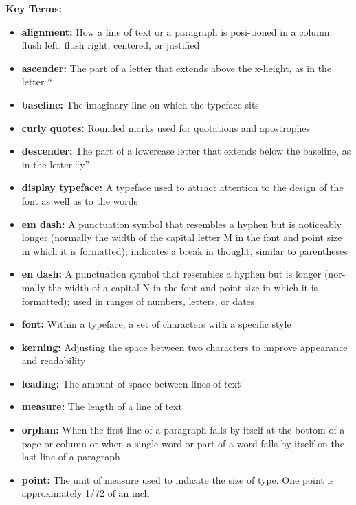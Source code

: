 \documentclass{report}
\begin{document}
    \bigbreak \noindent \bigbreak \noindent 
    \begin{Large}
        \textbf{Key Terms:}
    \end{Large}
    \bigbreak \noindent 
    \begin{itemize}
      \item \textbf{alignment:} How a line of text or a paragraph is posi-tioned in a column: flush left, flush right, centered, or justified
      \item \textbf{ascender:} The part of a letter that extends above the x-height, as in the letter “
      \item \textbf{baseline:} The imaginary line on which the typeface sits
      \item \textbf{curly quotes:} Rounded marks used for quotations and apostrophes
      \item \textbf{descender:} The part of a lowercase letter that extends below the baseline, as in the letter “y”
      \item \textbf{display typeface:} A typeface used to attract attention to the design of the font as well as to the words
      \item \textbf{em dash:} A  punctuation symbol that resembles a hyphen but is noticeably longer (normally the width of the capital letter M in the font and point size in which it is formatted); indicates a break in thought, similar to parentheses
      \item \textbf{en dash:} A punctuation symbol that resembles a hyphen but is longer (nor-mally the width of a capital N in the font and point size in which it is formatted); used in ranges of numbers, letters, or dates
      \item \textbf{font:} Within a typeface,  a set of characters with a specific style
      \item \textbf{kerning:} Adjusting the space between two  characters to improve appearance and readability
      \item \textbf{leading:} The amount of space between lines of text
      \item \textbf{measure:} The length of a line of text
      \item \textbf{orphan:} When the first line of a paragraph falls by itself at the bottom of a page or column or when a single word or part of a word falls by itself on the last line of a paragraph
      \item \textbf{point:} The unit of measure used to indicate the size of type. One point is approximately 1/72 of an inch

\end{itemize}
\end{document}
